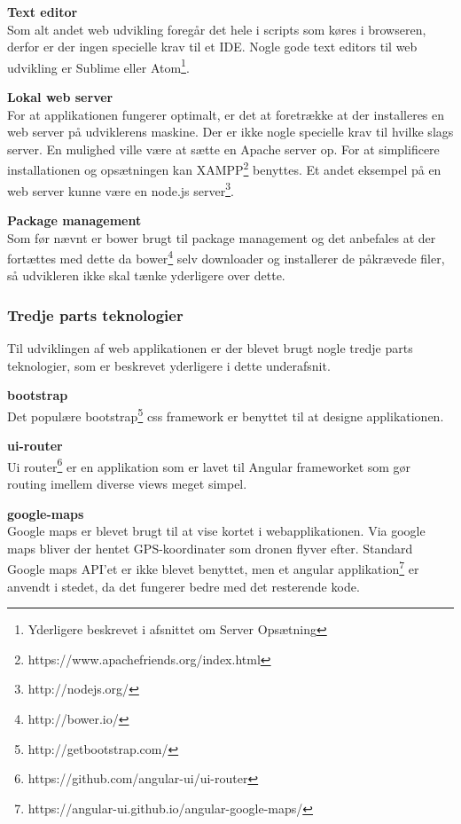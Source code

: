 \textbf{Text editor}\\
Som alt andet web udvikling foregår det hele i scripts som køres i browseren, derfor er der ingen specielle krav til et IDE. Nogle gode text editors til web udvikling er Sublime eller Atom\footnote{Yderligere beskrevet i afsnittet om Server Opsætning}.

\textbf{Lokal web server}\\
For at applikationen fungerer optimalt, er det at foretrække at der installeres en web server på udviklerens maskine. Der er ikke nogle specielle krav til hvilke slags server. En mulighed ville være at sætte en Apache server op. For at simplificere installationen og opsætningen kan XAMPP\footnote{https://www.apachefriends.org/index.html} benyttes. Et andet eksempel på en web server kunne være en node.js server\footnote{http://nodejs.org/}. 



\textbf{Package management}\\
Som før nævnt er bower brugt til package management og det anbefales at der fortættes med dette da bower\footnote{http://bower.io/} selv downloader og installerer de påkrævede filer, så udvikleren ikke skal tænke yderligere over dette.  

\newpage

\subsubsection*{Tredje parts teknologier}
Til udviklingen af web applikationen er der blevet brugt nogle tredje parts teknologier, som er beskrevet yderligere i dette underafsnit.

\textbf{bootstrap}\\
Det populære bootstrap\footnote{http://getbootstrap.com/} css framework er benyttet til at designe applikationen.

\textbf{ui-router}\\
Ui router\footnote{https://github.com/angular-ui/ui-router} er en applikation som er lavet til Angular frameworket som gør routing imellem diverse views meget simpel. 

\textbf{google-maps}\\
Google maps er blevet brugt til at vise kortet i webapplikationen. Via google maps bliver der hentet GPS-koordinater som dronen flyver efter. Standard Google maps API'et er ikke blevet benyttet, men et angular applikation\footnote{https://angular-ui.github.io/angular-google-maps/} er anvendt i stedet, da det fungerer bedre med det resterende kode.